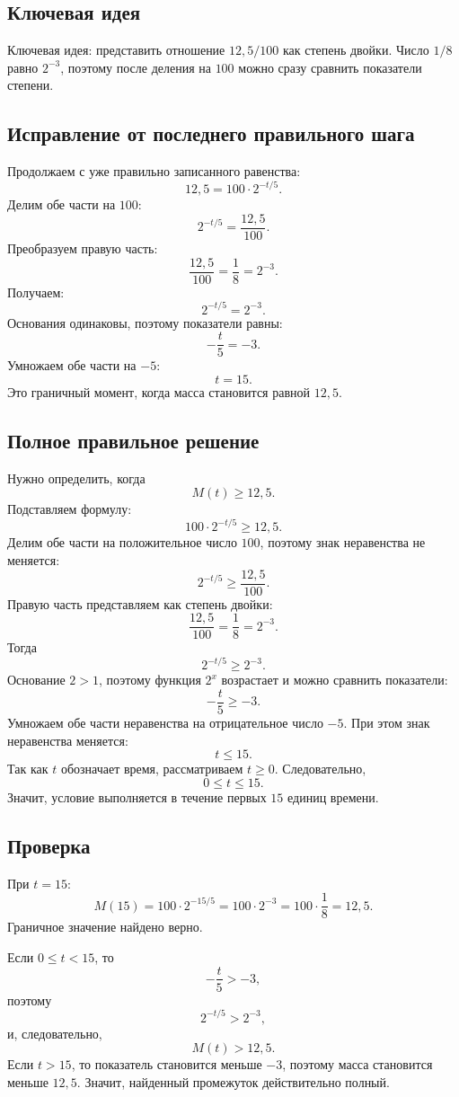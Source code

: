 \documentclass[12pt,a4paper]{article}
\begin{document}
\subsection*{Ключевая идея}
\textcolor{blue!60!black}{Ключевая идея:} представить отношение \(12{,}5/100\) как степень двойки. Число \(1/8\) равно \(2^{-3}\), поэтому после деления на \(100\) можно сразу сравнить показатели степени.

\subsection*{Исправление от последнего правильного шага}
Продолжаем с уже правильно записанного равенства:
\[
12{,}5=100\cdot 2^{-t/5}.
\]
Делим обе части на \(100\):
\[
2^{-t/5}=\frac{12{,}5}{100}.
\]
Преобразуем правую часть:
\[
\frac{12{,}5}{100}=\frac18=2^{-3}.
\]
Получаем:
\[
2^{-t/5}=2^{-3}.
\]
Основания одинаковы, поэтому показатели равны:
\[
-\frac{t}{5}=-3.
\]
Умножаем обе части на \(-5\):
\[
t=15.
\]
Это граничный момент, когда масса становится равной \(12{,}5\).

\subsection*{Полное правильное решение}
Нужно определить, когда
\[
M(t)\ge 12{,}5.
\]
Подставляем формулу:
\[
100\cdot 2^{-t/5}\ge 12{,}5.
\]
Делим обе части на положительное число \(100\), поэтому знак неравенства не меняется:
\[
2^{-t/5}\ge \frac{12{,}5}{100}.
\]
Правую часть представляем как степень двойки:
\[
\frac{12{,}5}{100}=\frac18=2^{-3}.
\]
Тогда
\[
2^{-t/5}\ge 2^{-3}.
\]
Основание \(2>1\), поэтому функция \(2^x\) возрастает и можно сравнить показатели:
\[
-\frac{t}{5}\ge -3.
\]
Умножаем обе части неравенства на отрицательное число \(-5\). При этом знак неравенства меняется:
\[
t\le 15.
\]
Так как \(t\) обозначает время, рассматриваем \(t\ge 0\). Следовательно,
\[
0\le t\le 15.
\]
Значит, условие выполняется в течение первых \(15\) единиц времени.

\subsection*{Проверка}
При \(t=15\):
\[
M(15)=100\cdot 2^{-15/5}
=100\cdot 2^{-3}
=100\cdot\frac18
=12{,}5.
\]
Граничное значение найдено верно.

Если \(0\le t<15\), то
\[
-\frac{t}{5}>-3,
\]
поэтому
\[
2^{-t/5}>2^{-3},
\]
и, следовательно,
\[
M(t)>12{,}5.
\]
Если \(t>15\), то показатель становится меньше \(-3\), поэтому масса становится меньше \(12{,}5\). Значит, найденный промежуток действительно полный.
\end{document}
